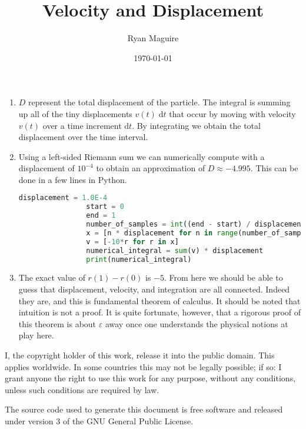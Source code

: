 \documentclass{article}
\title{Velocity and Displacement}
\author{Ryan Maguire}
\date{\today}
\begin{document}
    \maketitle
    \begin{enumerate}
        \item
            $D$ represent the total displacement of the particle.
            The integral is summing up all of the tiny displacements
            $v(t)\;\textrm{d}t$ that occur by moving with velocity
            $v(t)$ over a time increment $\textrm{d}t$. By integrating we
            obtain the total displacement over the time interval.
        \item
            Using a left-sided Riemann sum we can numerically compute
            with a displacement of $10^{-4}$ to obtain an approximation of
            $D\approx-4.995$. This can be done in a few lines in Python.
            \begin{lstlisting}[language = Python, gobble = 16]
                displacement = 1.0E-4
                start = 0
                end = 1
                number_of_samples = int((end - start) / displacement)
                x = [n * displacement for n in range(number_of_samples)]
                v = [-10*r for r in x]
                numerical_integral = sum(v) * displacement
                print(numerical_integral)
            \end{lstlisting}
        \item
            The exact value of $r(1)-r(0)$ is $-5$.
            From here we should be able to guess that displacement, velocity,
            and integration are all connected. Indeed they are, and this is
            fundamental theorem of calculus. It should be noted that intuition
            is not a proof. It is quite fortunate, however, that a rigorous
            proof of this theorem is about $\varepsilon$ away once one
            understands the physical notions at play here.
    \end{enumerate}
    \newpage
    I, the copyright holder of this work, release it into the public domain.
    This applies worldwide. In some countries this may not be legally possible;
    if so: I grant anyone the right to use this work for any purpose, without
    any conditions, unless such conditions are required by law.
    \par\hfill\par
    The source code used to generate this document is free software and released
    under version 3 of the GNU General Public License.
\end{document}
